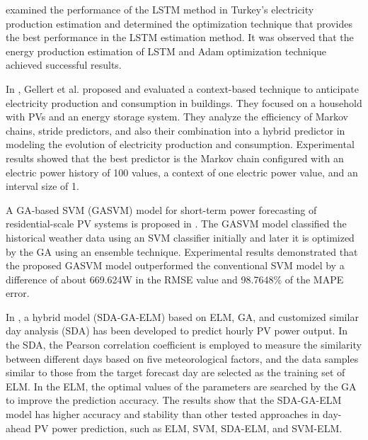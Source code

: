 \cite{9848724} examined the performance of the LSTM method in Turkey's electricity production estimation and determined the optimization technique that provides the best performance in the LSTM estimation method.
It was observed that the energy production estimation of LSTM and Adam optimization technique achieved successful results.

In \cite{GELLERT2019546}, Gellert et al. proposed and evaluated a context-based technique to anticipate electricity production and consumption in buildings.
They focused on a household with PVs and an energy storage system.
They analyze the efficiency of Markov chains, stride predictors, and also their combination into a hybrid predictor in modeling the evolution of electricity production and consumption.
Experimental results showed that the best predictor is the Markov chain configured with an electric power history of 100 values, a context of one electric power value, and an interval size of 1.

A GA-based SVM (GASVM) model for short-term power forecasting of residential-scale PV systems is proposed in \cite{VANDEVENTER2019367}.
The GASVM model classified the historical weather data using an SVM classifier initially and later it is optimized by the GA using an ensemble technique.
Experimental results demonstrated that the proposed GASVM model outperformed the conventional SVM model by a difference of about 669.624W in the RMSE value and 98.7648\% of the MAPE error.

In \cite{ZHOU2020117894}, a hybrid model (SDA-GA-ELM) based on ELM, GA, and customized similar day analysis (SDA) has been developed to predict hourly PV power output.
In the SDA, the Pearson correlation coefficient is employed to measure the similarity between different days based on five meteorological factors, and the data samples similar to those from the target forecast day are selected as the training set of ELM.
In the ELM, the optimal values of the parameters are searched by the GA to improve the prediction accuracy.
The results show that the SDA-GA-ELM model has higher accuracy and stability than other tested approaches in day-ahead PV power prediction, such as ELM, SVM, SDA-ELM, and SVM-ELM.

